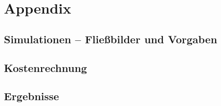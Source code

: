 \appendix
\section*{Appendix}

\subsection{Simulationen -- Fließbilder und Vorgaben}
\label{ch:a_sim}



\subsection{Kostenrechnung}
\label{ch:a_kosten}


\subsection{Ergebnisse}
\label{ch:a_erg}